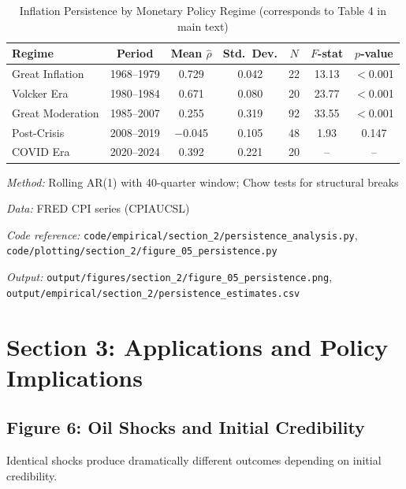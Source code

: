\documentclass[11pt]{article}
\begin{document}
\begin{table}[htbp]
\centering
\caption{Inflation Persistence by Monetary Policy Regime (corresponds to Table 4 in main text)}
\label{tab:persistence_regimes}
\begin{threeparttable}
\begin{tabular}{lcccccc}
\toprule
Regime & Period & Mean $\hat{\rho}$ & Std.\ Dev. & $N$ & $F$-stat & $p$-value \\
\midrule
Great Inflation & 1968--1979 & 0.729 & 0.042 & 22 & 13.13 & $<$0.001 \\
Volcker Era & 1980--1984 & 0.671 & 0.080 & 20 & 23.77 & $<$0.001 \\
Great Moderation & 1985--2007 & 0.255 & 0.319 & 92 & 33.55 & $<$0.001 \\
Post-Crisis & 2008--2019 & $-$0.045 & 0.105 & 48 & 1.93 & 0.147 \\
COVID Era & 2020--2024 & 0.392 & 0.221 & 20 & -- & -- \\
\bottomrule
\end{tabular}
\begin{tablenotes}
\small
\item \textit{Method:} Rolling AR(1) with 40-quarter window; Chow tests for structural breaks
\item \textit{Data:} FRED CPI series (CPIAUCSL)
\item \textit{Code reference:} \texttt{code/empirical/section\_2/persistence\_analysis.py}, \texttt{code/plotting/section\_2/figure\_05\_persistence.py}
\item \textit{Output:} \texttt{output/figures/section\_2/figure\_05\_persistence.png}, \texttt{output/empirical/section\_2/persistence\_estimates.csv}
\end{tablenotes}
\end{threeparttable}
\end{table}

\section{Section 3: Applications and Policy Implications}
\label{sec:applications}

\subsection{Figure 6: Oil Shocks and Initial Credibility}

Identical shocks produce dramatically different outcomes depending on initial credibility.
\end{document}
